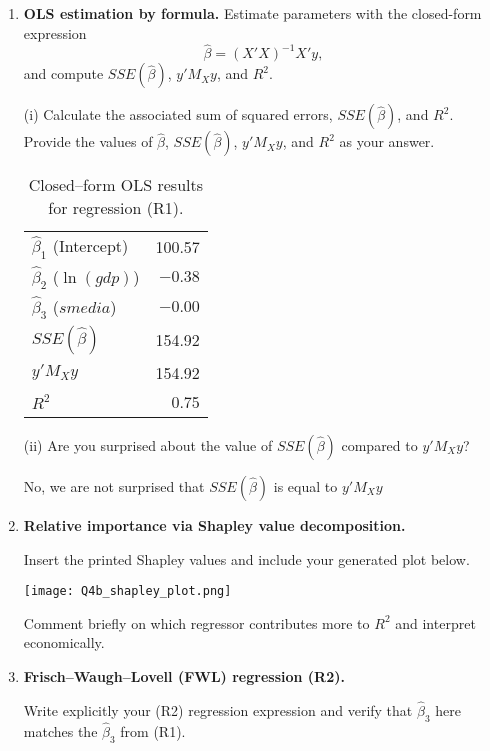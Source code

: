\documentclass[12pt,a4paper]{article}
\begin{document}
\begin{enumerate}[label=(\alph*)]

\item \textbf{OLS estimation by formula.}  
Estimate parameters with the closed-form expression
\[
\hat{\beta} = (X'X)^{-1}X'y,
\]
and compute $SSE(\hat{\beta})$, $y'M_Xy$, and $R^2$.

(i) Calculate the associated sum of squared errors, $SSE(\hat{\beta})$, and $R^2$. 
Provide the values of $\hat{\beta}$, $SSE(\hat{\beta})$, $y'M_Xy$, and $R^2$ as your answer.

\begin{table}[h!]\centering
\begin{tabular}{l r}
\hline
$\hat{\beta}_1$ (Intercept) & 100.57 \\
$\hat{\beta}_2$ ($\ln(gdp)$) & $-0.38$ \\
$\hat{\beta}_3$ ($smedia$) & $-0.00$ \\
\hline
$SSE(\hat{\beta})$ & 154.92 \\
$y'M_Xy$ & 154.92 \\
$R^2$ & 0.75 \\
\hline
\end{tabular}
\caption{Closed–form OLS results for regression (R1).}
\end{table}

\vspace{0.2cm}
(ii) Are you surprised about the value of $SSE(\hat{\beta})$ compared to $y'M_Xy$?

No, we are not surprised that $SSE(\hat{\beta})$  is equal to $y'M_Xy$


\item \textbf{Relative importance via Shapley value decomposition.}

Insert the printed Shapley values and include your generated plot below.  
\begin{center}
\texttt{[image: Q4b\_shapley\_plot.png]}
\end{center}
Comment briefly on which regressor contributes more to $R^2$ and interpret economically.


\item \textbf{Frisch–Waugh–Lovell (FWL) regression (R2).}

Write explicitly your (R2) regression expression and verify that $\hat{\beta}_3$ here  
matches the $\hat{\beta}_3$ from (R1).


\end{enumerate}
\end{document}
